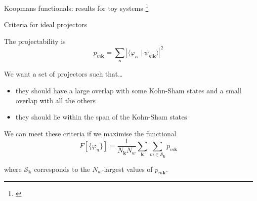 \documentclass[xcolor=table,aspectratio=169]{beamer}
\newcommand\blfootcite[1]{%
  \begingroup
  \renewcommand\thefootnote{}\footnote{\hspace{-4ex}\cite{#1}}%
  \addtocounter{footnote}{-1}%
  \endgroup
}
\numberwithin{equation}{section}
\newcommand{\backupend}{
   \setcounter{framenumber}{\value{finalframe}}
}
\begin{document}
\begin{frame}{Koopmans functionals: results for toy systems}
   \blfootcite{Schubert2023}
\end{frame}

\begin{frame}{Criteria for ideal projectors}

   The projectability is
   \begin{equation*}
      p_{m\mathbf{k}} = \sum_n |\langle \varphi_n \mid \psi_{m\mathbf{k}}\rangle |^2
   \end{equation*}

   We want a set of projectors such that\dots
   \begin{itemize}
      \item they should have a large overlap with some Kohn-Sham states and a small overlap with all the others%
      \item they should lie within the span of the Kohn-Sham states%
   \end{itemize}

   We can meet these criteria if we maximise the functional
   \begin{equation*}
      F[\{\varphi_n\}] = \frac{1}{N_\mathbf{k} N_w} \sum_{\mathbf{k}} \sum_{m \in \mathcal{S}_\mathbf{k}} p_{m\mathbf{k}}
   \end{equation*}

   where $\mathcal{S}_\mathbf{k}$ corresponds to the $N_w$-largest values of $p_{m\mathbf{k}}$.
\end{frame}
\backupend
\end{document}
